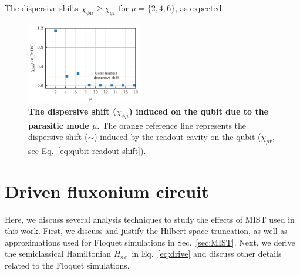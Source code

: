 \documentclass[%
reprint,
superscriptaddress,
 amsmath,amssymb,
 aps,
 prx,
longbibliography,
floatfix,
]{revtex4-2}
\begin{document}
The dispersive shifts $\chi_{\phi\mu}\ge\chi_{\phi\mathrm{r}}$ for $\mu=\{2,4,6\}$, as expected. 
\begin{figure}[t]
    \centering
    \includegraphics[width=0.45\textwidth]{Supp_Fig/dispersive_shift.pdf}
    \caption{{\bf The dispersive shift ($\chi_{\phi\mu}$) induced on the qubit due to the parasitic mode $\mu$.} The orange reference line represents the dispersive shift ($\sim $) induced by the readout cavity on the qubit ($\chi_{\mu\textrm{r}}$, see Eq.~\ref{eq:qubit-readout-shift}).}
    \label{fig:dispersive-shift}
\end{figure}

\section{Driven fluxonium circuit}\label{app:MIST}
Here, we discuss several analysis techniques to study the effects of MIST used in this work. First, we discuss and justify the Hilbert space truncation, as well as approximations used for Floquet simulations in Sec.~\ref{sec:MIST}. Next, we derive the semiclassical Hamiltonian $H_\textrm{s.c.}$ in Eq.~\ref{eq:drive} and discuss other details related to the Floquet simulations.
\end{document}
